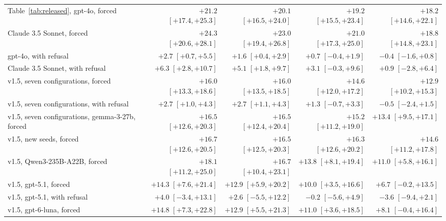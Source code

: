 \documentclass{article}
\begin{document}
\begin{table}[htbp]
{\begin{tabular}{lrrrr}
Table~\ref{tab:released}, gpt-4o, forced & $+21.2$ {\scriptsize$[+17.4,+25.3]$} & $+20.1$ {\scriptsize$[+16.5,+24.0]$} & $+19.2$ {\scriptsize$[+15.5,+23.4]$} & $+18.2$ {\scriptsize$[+14.6,+22.1]$}\\
\quad Claude 3.5 Sonnet, forced & $+24.3$ {\scriptsize$[+20.6,+28.1]$} & $+23.0$ {\scriptsize$[+19.4,+26.8]$} & $+21.0$ {\scriptsize$[+17.3,+25.0]$} & $+18.8$ {\scriptsize$[+14.8,+23.1]$}\\
\quad gpt-4o, with refusal & $+2.7$ {\scriptsize$[+0.7,+5.5]$} & $+1.6$ {\scriptsize$[+0.4,+2.9]$} & $+0.7$ {\scriptsize$[-0.4,+1.9]$} & $-0.4$ {\scriptsize$[-1.6,+0.8]$}\\
\quad Claude 3.5 Sonnet, with refusal & $+6.3$ {\scriptsize$[+2.8,+10.7]$} & $+5.1$ {\scriptsize$[+1.8,+9.7]$} & $+3.1$ {\scriptsize$[-0.3,+9.6]$} & $+0.9$ {\scriptsize$[-2.8,+6.4]$}\\
\quad v1.5, seven configurations, forced & $+16.0$ {\scriptsize$[+13.3,+18.6]$} & $+16.0$ {\scriptsize$[+13.5,+18.5]$} & $+14.6$ {\scriptsize$[+12.0,+17.2]$} & $+12.9$ {\scriptsize$[+10.2,+15.3]$}\\
\quad v1.5, seven configurations, with refusal & $+2.7$ {\scriptsize$[+1.0,+4.3]$} & $+2.7$ {\scriptsize$[+1.1,+4.3]$} & $+1.3$ {\scriptsize$[-0.7,+3.3]$} & $-0.5$ {\scriptsize$[-2.4,+1.5]$}\\
\quad v1.5, seven configurations, gemma-3-27b, forced & $+16.5$ {\scriptsize$[+12.6,+20.3]$} & $+16.5$ {\scriptsize$[+12.4,+20.4]$} & $+15.2$ {\scriptsize$[+11.2,+19.0]$} & $+13.4$ {\scriptsize$[+9.5,+17.1]$}\\
\quad v1.5, new seeds, forced & $+16.7$ {\scriptsize$[+12.6,+20.5]$} & $+16.5$ {\scriptsize$[+12.5,+20.3]$} & $+16.3$ {\scriptsize$[+12.6,+20.2]$} & $+14.6$ {\scriptsize$[+11.2,+17.8]$}\\
\quad v1.5, Qwen3-235B-A22B, forced & $+18.1$ {\scriptsize$[+11.2,+25.0]$} & $+16.7$ {\scriptsize$[+10.4,+23.1]$} & $+13.8$ {\scriptsize$[+8.1,+19.4]$} & $+11.0$ {\scriptsize$[+5.8,+16.1]$}\\
\quad v1.5, gpt-5.1, forced & $+14.3$ {\scriptsize$[+7.6,+21.4]$} & $+12.9$ {\scriptsize$[+5.9,+20.2]$} & $+10.0$ {\scriptsize$[+3.5,+16.6]$} & $+6.7$ {\scriptsize$[-0.2,+13.5]$}\\
\quad v1.5, gpt-5.1, with refusal & $+4.0$ {\scriptsize$[-3.4,+13.1]$} & $+2.6$ {\scriptsize$[-5.5,+12.2]$} & $-0.2$ {\scriptsize$[-5.6,+4.9]$} & $-3.6$ {\scriptsize$[-9.4,+2.1]$}\\
\quad v1.5, gpt-6-luna, forced & $+14.8$ {\scriptsize$[+7.3,+22.8]$} & $+12.9$ {\scriptsize$[+5.5,+21.3]$} & $+11.0$ {\scriptsize$[+3.6,+18.5]$} & $+8.1$ {\scriptsize$[-0.4,+16.4]$}\\

\end{tabular}}
\end{table}
\end{document}
